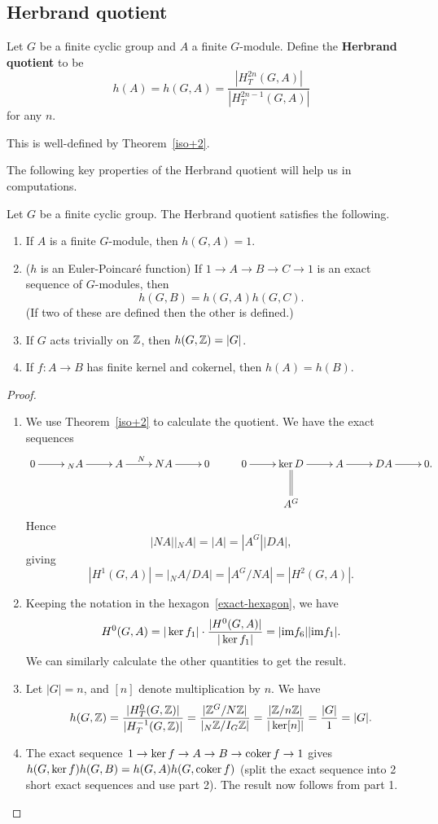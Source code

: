\subsection{Herbrand quotient}
\begin{df}
Let $G$ be a finite cyclic group and $A$ a finite $G$-module. Define the \textbf{Herbrand quotient} to be
\[
h(A)=h(G,A)=\frac{|H_T^{2n}(G,A)|}{|H_T^{2n-1}(G,A)|}
\]
for any $n$.
\end{df}
This is well-defined by Theorem~\ref{iso+2}.

The following key properties of the Herbrand quotient will help us in computations.
\begin{pr}
Let $G$ be a finite cyclic group. The Herbrand quotient satisfies the following.
\begin{enumerate}
\item If $A$ is a finite $G$-module, then $h(G,A)=1$.
\item ($h$ is an Euler-Poincar\'e function) If $1\to A\to B\to C\to 1$ is an exact sequence of $G$-modules, then
\[
h(G,B)=h(G,A)h(G,C).
\]
(If two of these are defined then the other is defined.)
\item If $G$ acts trivially on $\mathbb{Z}$, then $h(G,\mathbb{Z})=|G|$.
\item If $f:A\to B$ has finite kernel and cokernel, then $h(A)=h(B)$.
\end{enumerate}
\end{pr}
\begin{proof}
\begin{enumerate}
\item
We use Theorem~\ref{iso+2} to calculate the quotient. 
We have the exact sequences
\[
\xymatrix{
0\ar[r] & {}_N A \ar[r] &A \ar[r]^N &NA \ar[r] &0 &
0\ar[r] &\ker D\ar@{=}[d]\ar[r] & A\ar[r] & DA \ar[r] & 0.\\
&&&&&&A^G&&&
}
\]
Hence
\[
|NA||{}_NA|=|A|=|A^G||DA|,
\]
giving
\[
|H^1(G,A)|=|{}_NA/DA|=|A^G/NA|=|H^2(G,A)|.
\]
\item Keeping the notation in the hexagon~\ref{exact-hexagon}, we have
\[
H^0(G,A)=|\ker f_1|\cdot \frac{|H^0(G,A)|}{|\ker f_1|}
=|\text{im} f_6||\text{im} f_1|.
\]
We can similarly calculate the other quantities to get the result.
\item Let $|G|=n$, and $[n]$ denote multiplication by $n$. We have
\[
h(G,\mathbb{Z})=\frac{|H_T^0(G,\mathbb{Z})|}{|H_T^{-1}(G,\mathbb{Z})|}
=\frac{|\mathbb{Z}^G/N\mathbb{Z}|}{|{}_N\mathbb{Z}/I_G\mathbb{Z}|}=\frac{|\mathbb{Z}/n\mathbb{Z}|}{|\ker[n]|}=\frac{|G|}{1}=|G|.
\]
\item The exact sequence $1\to \ker f\to A\to B \to \operatorname{coker} f\to 1$ gives $h(G,\ker f)h(G,B)=h(G,A)h(G,\operatorname{coker} f)$ (split the exact sequence into 2 short exact sequences and use part 2). The result now follows from part 1.\qedhere
\end{enumerate}
\end{proof}

